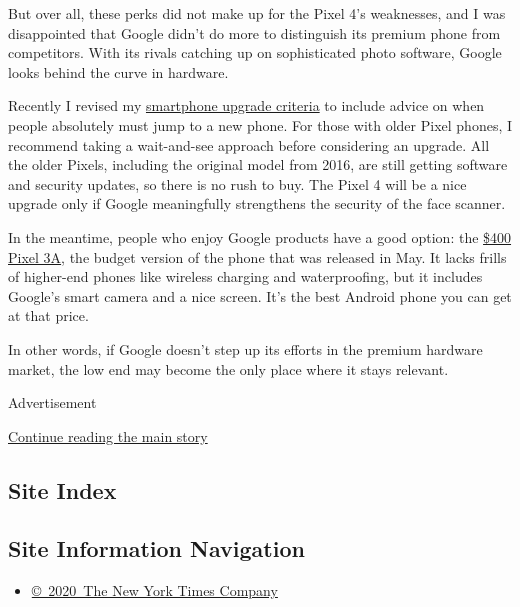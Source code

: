 But over all, these perks did not make up for the Pixel 4's weaknesses,
and I was disappointed that Google didn't do more to distinguish its
premium phone from competitors. With its rivals catching up on
sophisticated photo software, Google looks behind the curve in hardware.

Recently I revised my
\href{https://www.nytimes3xbfgragh.onion/2019/09/26/technology/personaltech/why-we-upgraded-our-reviews-approach-for-apples-iphone-11.html}{smartphone
upgrade criteria} to include advice on when people absolutely must jump
to a new phone. For those with older Pixel phones, I recommend taking a
wait-and-see approach before considering an upgrade. All the older
Pixels, including the original model from 2016, are still getting
software and security updates, so there is no rush to buy. The Pixel 4
will be a nice upgrade only if Google meaningfully strengthens the
security of the face scanner.

In the meantime, people who enjoy Google products have a good option:
the
\href{https://www.nytimes3xbfgragh.onion/2019/05/07/technology/personaltech/pixel-3a.html}{\$400
Pixel 3A}, the budget version of the phone that was released in May. It
lacks frills of higher-end phones like wireless charging and
waterproofing, but it includes Google's smart camera and a nice screen.
It's the best Android phone you can get at that price.

In other words, if Google doesn't step up its efforts in the premium
hardware market, the low end may become the only place where it stays
relevant.

Advertisement

\protect\hyperlink{after-bottom}{Continue reading the main story}

\hypertarget{site-index}{%
\subsection{Site Index}\label{site-index}}

\hypertarget{site-information-navigation}{%
\subsection{Site Information
Navigation}\label{site-information-navigation}}

\begin{itemize}
\tightlist
\item
  \href{https://help.nytimes3xbfgragh.onion/hc/en-us/articles/115014792127-Copyright-notice}{©~2020~The
  New York Times Company}
\end{itemize}


